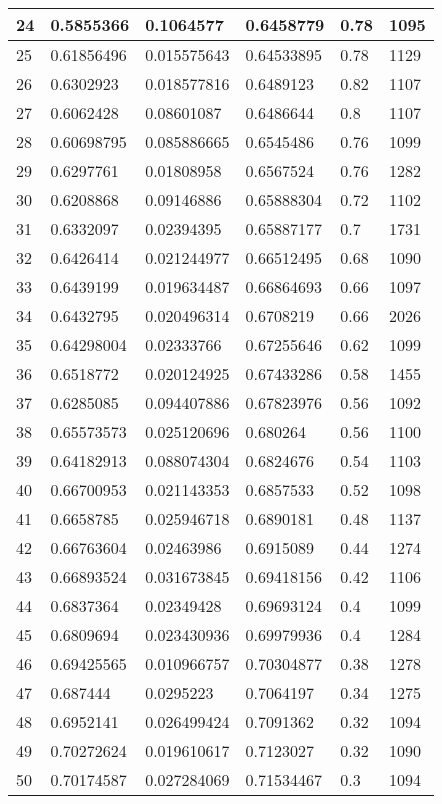 \begin{longtable}{|l|l|l|l|l|l|}
24 & 0.5855366 & 0.1064577 & 0.6458779 & 0.78 & 1095 \\ \hline 
25 & 0.61856496 & 0.015575643 & 0.64533895 & 0.78 & 1129 \\ \hline 
26 & 0.6302923 & 0.018577816 & 0.6489123 & 0.82 & 1107 \\ \hline 
27 & 0.6062428 & 0.08601087 & 0.6486644 & 0.8 & 1107 \\ \hline 
28 & 0.60698795 & 0.085886665 & 0.6545486 & 0.76 & 1099 \\ \hline 
29 & 0.6297761 & 0.01808958 & 0.6567524 & 0.76 & 1282 \\ \hline 
30 & 0.6208868 & 0.09146886 & 0.65888304 & 0.72 & 1102 \\ \hline 
31 & 0.6332097 & 0.02394395 & 0.65887177 & 0.7 & 1731 \\ \hline 
32 & 0.6426414 & 0.021244977 & 0.66512495 & 0.68 & 1090 \\ \hline 
33 & 0.6439199 & 0.019634487 & 0.66864693 & 0.66 & 1097 \\ \hline 
34 & 0.6432795 & 0.020496314 & 0.6708219 & 0.66 & 2026 \\ \hline 
35 & 0.64298004 & 0.02333766 & 0.67255646 & 0.62 & 1099 \\ \hline 
36 & 0.6518772 & 0.020124925 & 0.67433286 & 0.58 & 1455 \\ \hline 
37 & 0.6285085 & 0.094407886 & 0.67823976 & 0.56 & 1092 \\ \hline 
38 & 0.65573573 & 0.025120696 & 0.680264 & 0.56 & 1100 \\ \hline 
39 & 0.64182913 & 0.088074304 & 0.6824676 & 0.54 & 1103 \\ \hline 
40 & 0.66700953 & 0.021143353 & 0.6857533 & 0.52 & 1098 \\ \hline 
41 & 0.6658785 & 0.025946718 & 0.6890181 & 0.48 & 1137 \\ \hline 
42 & 0.66763604 & 0.02463986 & 0.6915089 & 0.44 & 1274 \\ \hline 
43 & 0.66893524 & 0.031673845 & 0.69418156 & 0.42 & 1106 \\ \hline 
44 & 0.6837364 & 0.02349428 & 0.69693124 & 0.4 & 1099 \\ \hline 
45 & 0.6809694 & 0.023430936 & 0.69979936 & 0.4 & 1284 \\ \hline 
46 & 0.69425565 & 0.010966757 & 0.70304877 & 0.38 & 1278 \\ \hline 
47 & 0.687444 & 0.0295223 & 0.7064197 & 0.34 & 1275 \\ \hline 
48 & 0.6952141 & 0.026499424 & 0.7091362 & 0.32 & 1094 \\ \hline 
49 & 0.70272624 & 0.019610617 & 0.7123027 & 0.32 & 1090 \\ \hline 
50 & 0.70174587 & 0.027284069 & 0.71534467 & 0.3 & 1094 \\ \hline 
\end{longtable}